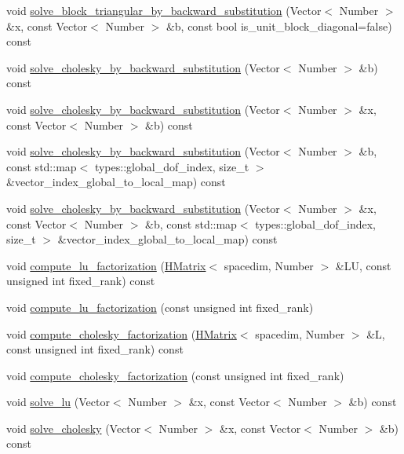 \begin{DoxyCompactItemize}
\item 
void \hyperlink{classHMatrix_a69432f004b60ade76aaabf2c94dd205c}{solve\+\_\+block\+\_\+triangular\+\_\+by\+\_\+backward\+\_\+substitution} (Vector$<$ Number $>$ \&x, const Vector$<$ Number $>$ \&b, const bool is\+\_\+unit\+\_\+block\+\_\+diagonal=false) const
\item 
void \hyperlink{classHMatrix_a054ad84d52a9ee6df9df3bda0a17cfb7}{solve\+\_\+cholesky\+\_\+by\+\_\+backward\+\_\+substitution} (Vector$<$ Number $>$ \&b) const
\item 
void \hyperlink{classHMatrix_a880948492a7df252f3696219f6966703}{solve\+\_\+cholesky\+\_\+by\+\_\+backward\+\_\+substitution} (Vector$<$ Number $>$ \&x, const Vector$<$ Number $>$ \&b) const
\item 
void \hyperlink{classHMatrix_ae8bbf6f35a2099872fbcbfda2cb1abbd}{solve\+\_\+cholesky\+\_\+by\+\_\+backward\+\_\+substitution} (Vector$<$ Number $>$ \&b, const std\+::map$<$ types\+::global\+\_\+dof\+\_\+index, size\+\_\+t $>$ \&vector\+\_\+index\+\_\+global\+\_\+to\+\_\+local\+\_\+map) const
\item 
void \hyperlink{classHMatrix_a8dcb361dfb254ff716755ba8b7ed9cf1}{solve\+\_\+cholesky\+\_\+by\+\_\+backward\+\_\+substitution} (Vector$<$ Number $>$ \&x, const Vector$<$ Number $>$ \&b, const std\+::map$<$ types\+::global\+\_\+dof\+\_\+index, size\+\_\+t $>$ \&vector\+\_\+index\+\_\+global\+\_\+to\+\_\+local\+\_\+map) const
\item 
void \hyperlink{classHMatrix_acf95fce81ec83a759d1db8d10c3e34fb}{compute\+\_\+lu\+\_\+factorization} (\hyperlink{classHMatrix}{H\+Matrix}$<$ spacedim, Number $>$ \&LU, const unsigned int fixed\+\_\+rank) const
\item 
void \hyperlink{classHMatrix_aba14c63550f42d8a971beab340337b0e}{compute\+\_\+lu\+\_\+factorization} (const unsigned int fixed\+\_\+rank)
\item 
void \hyperlink{classHMatrix_a7d6c76f7db2b9239f24df292e945a970}{compute\+\_\+cholesky\+\_\+factorization} (\hyperlink{classHMatrix}{H\+Matrix}$<$ spacedim, Number $>$ \&L, const unsigned int fixed\+\_\+rank) const
\item 
void \hyperlink{classHMatrix_abc6e787e46fb082579b2d3aea1ad54f6}{compute\+\_\+cholesky\+\_\+factorization} (const unsigned int fixed\+\_\+rank)
\item 
void \hyperlink{classHMatrix_a83e9dd55091e7eaed11ffb803321c49d}{solve\+\_\+lu} (Vector$<$ Number $>$ \&x, const Vector$<$ Number $>$ \&b) const
\item 
void \hyperlink{classHMatrix_ac5582db8445ec15c69bc4bfdda19d547}{solve\+\_\+cholesky} (Vector$<$ Number $>$ \&x, const Vector$<$ Number $>$ \&b) const

\end{DoxyCompactItemize}
